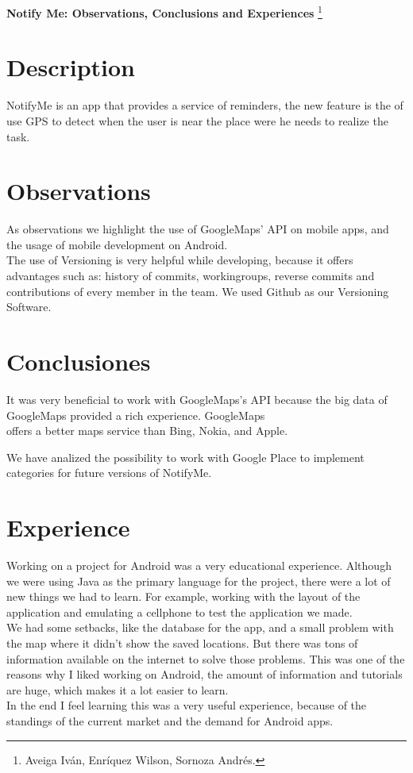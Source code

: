 \textbf{Notify Me: Observations, Conclusions and Experiences} \footnote{Aveiga Iván, Enríquez Wilson, Sornoza Andrés.}


\section{Description}
NotifyMe is an app that provides a service of reminders, the new feature is the of use GPS to detect when the user is near the place were he needs to realize the task.

\section{Observations}

As observations we highlight the use of GoogleMaps' API on mobile apps, and the usage of mobile development on Android. \\

The use of Versioning is very helpful while developing, because it offers advantages such as: history of commits, workingroups, reverse commits and contributions of every member in the team. We used Github as  our Versioning Software.

\section{Conclusiones}
It was very beneficial to work with GoogleMaps's API because the big data of GoogleMaps provided a rich experience. GoogleMaps \\ offers a better maps service than Bing, Nokia, and Apple.

We have analized the possibility to work with Google Place to implement categories for future versions of NotifyMe. \\

\section{Experience}

Working on a project for Android was a very educational experience. Although we were using Java as the primary language for the project, there were a lot of new things we had to learn. For example, working with the layout of the application and emulating a cellphone to test the application we made. \\

We had some setbacks, like the database for the app, and a small problem with the map where it didn’t show the saved locations. But there was tons of information available on the internet to solve those problems. This was one of the reasons why I liked working on Android, the amount of information and tutorials are huge, which makes it a lot easier to learn.\\

In the end I feel learning this was a very useful experience, because of the standings of the current market and the demand for Android apps. 
